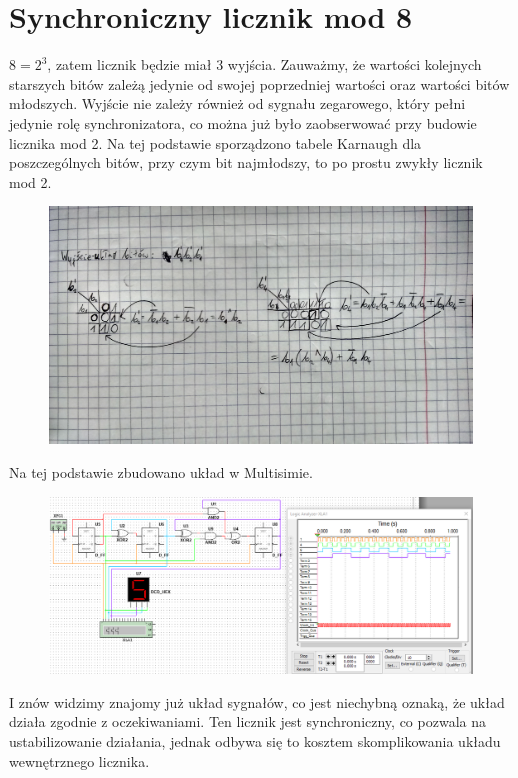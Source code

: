\documentclass[12pt,a4paper]{article}
\begin{document}
\newpage
\section{Synchroniczny licznik mod 8}
$8 = 2^3$, zatem licznik będzie miał 3 wyjścia. Zauważmy, że wartości kolejnych starszych bitów zależą jedynie od swojej poprzedniej wartości oraz wartości bitów młodszych. Wyjście nie zależy również od sygnału zegarowego, który pełni jedynie rolę synchronizatora, co można już było zaobserwować przy budowie licznika mod 2. Na tej podstawie sporządzono tabele Karnaugh dla poszczególnych bitów, przy czym bit najmłodszy, to po prostu zwykły licznik mod 2.

\begin{figure}[H]
\centering
\includegraphics[width=\textwidth]{img/4c_tables}
\end{figure}

Na tej podstawie zbudowano układ w Multisimie.
\begin{figure}[H]
\centering
\includegraphics[width=\textwidth]{img/4c_circuit}
\end{figure}

I znów widzimy znajomy już układ sygnałów, co jest niechybną oznaką, że układ działa zgodnie z oczekiwaniami. Ten licznik jest synchroniczny, co pozwala na ustabilizowanie działania, jednak odbywa się to kosztem skomplikowania układu wewnętrznego licznika.
\end{document}
